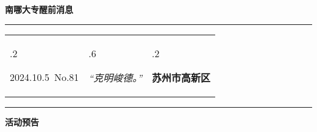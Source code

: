 \documentclass[letterpaper, 12pt]{article}
\begin{document}
\begin{center}
    \Huge\textbf{南哪大专醒前消息}
\end{center}
\vspace{4mm}
\hrule
\renewcommand\tabularxcolumn[1]{m{#1}}
\begin{tabularx}{\textwidth}{>{\hsize.2\hsize}X>{\hsize.6\hsize}X>{\hsize.2\hsize}X}
    \begin{flushleft}
        2024.10.5\, No.81
    \end{flushleft}
    &
    \begin{center}
        \textit{“克明峻德。”}
    \end{center}
    &
    \begin{flushright}
        \textbf{苏州市高新区}
    \end{flushright}
\end{tabularx}
\vspace{-3.5mm}
\hrule
\vspace{4mm}
\centerline{\huge\textbf{活动预告}}
\end{document}
